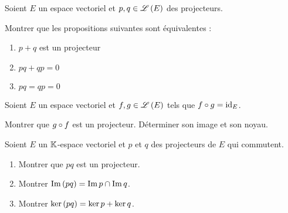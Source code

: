 \begin{exo}
Soient \(E\) un espace vectoriel et \(p,q\in\mathscr{L}\left(E\right)\) des projecteurs.

Montrer que les propositions suivantes sont équivalentes :

\begin{enumerate}
\item \(p+q\) est un projecteur \\

\item \(pq+qp=0\) \\

\item \(pq=qp=0\)
\end{enumerate}
\end{exo}

\begin{corr}
\end{corr}

\begin{exo}
Soient \(E\) un espace vectoriel et \(f,g\in\mathscr{L}\left(E\right)\) tels que \(f\circ g=\mathrm{id}_{E}\).

Montrer que \(g\circ f\) est un projecteur. Déterminer son image et son noyau.
\end{exo}

\begin{corr}
\end{corr}

\begin{exo}
Soient \(E\) un \(\mathbb{K}\)-espace vectoriel et \(p\) et \(q\) des projecteurs de \(E\) qui commutent.

\begin{enumerate}
\item Montrer que \(pq\) est un projecteur. \\

\item Montrer \(\operatorname{Im}\left(pq\right)=\operatorname{Im} p\cap\operatorname{Im} q\). \\

\item Montrer \(\ker\left(pq\right)=\ker p+\ker q\).
\end{enumerate}
\end{exo}

\begin{corr}
\end{corr}

